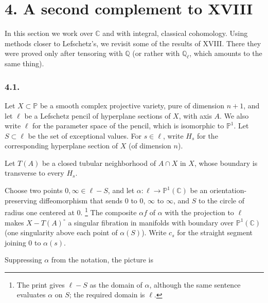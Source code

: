 \section*{4. A second complement to XVIII}

In this section we work over $\mathbb C$ and with integral, classical
cohomology.  Using methods closer to Lefschetz's, we revisit some of the
results of XVIII.  There they were proved only after tensoring with
$\mathbb Q$ (or rather with $\mathbb Q_\ell$, which amounts to the same
thing).

\subsubsection*{4.1.}
Let $X\subset\mathbb P$ be a smooth complex projective variety, pure of
dimension $n+1$, and let $\ell$ be a Lefschetz pencil of hyperplane
sections of $X$, with axis $A$.  We also write $\ell$ for the parameter
space of the pencil, which is isomorphic to $\mathbb P^1$.  Let
$S\subset\ell$ be the set of exceptional values.  For $s\in\ell$, write
$H_s$ for the corresponding hyperplane section of $X$ (of dimension $n$).

Let $T(A)$ be a closed tubular neighborhood of $A\cap X$ in $X$, whose
boundary is transverse to every $H_s$.

Choose two points $0,\infty\in\ell-S$, and let
$\alpha:\ell\to\mathbb P^1(\mathbb C)$ be an orientation-preserving
diffeomorphism that sends $0$ to $0$, $\infty$ to $\infty$, and $S$ to the
circle of radius one centered at $0$.
\footnote{The print gives $\ell-S$ as the domain of $\alpha$, although the
same sentence evaluates $\alpha$ on $S$; the required domain is $\ell$.}
The composite $\alpha f$ of $\alpha$ with the projection to $\ell$ makes
$X-T(A)^\circ$ a singular fibration in manifolds with boundary over
$\mathbb P^1(\mathbb C)$ (one singularity above each point of
$\alpha(S)$).  Write $c_s$ for the straight segment joining $0$ to
$\alpha(s)$.

Suppressing $\alpha$ from the notation, the picture is
\begin{center}
\end{center}

